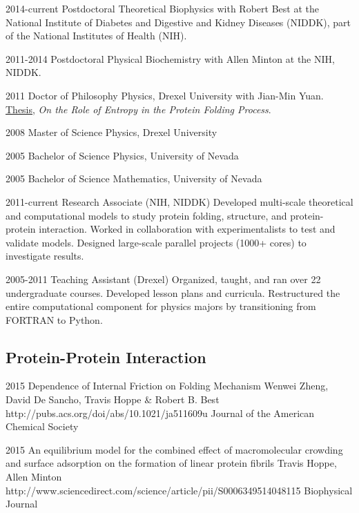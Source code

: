 \documentclass[]{scrartcl}
\begin{document}
\begin{cleanCV}


\WorkExperience
{2014-current}
{Postdoctoral}
{
Theoretical Biophysics with Robert Best at the
National Institute of Diabetes and Digestive and Kidney Diseases (NIDDK), 
part of the National Institutes of Health (NIH).
}

\WorkExperience
{2011-2014}
{Postdoctoral}
{
Physical Biochemistry with Allen Minton at the NIH, NIDDK.
}


\WorkExperience
{2011}
{Doctor of Philosophy}
{%
Physics, Drexel University with Jian-Min Yuan. 
\href{https://idea.library.drexel.edu/islandora/object/idea:3488}{Thesis},
\emph{On the Role of Entropy in the Protein Folding Process}.
}

\WorkExperience
{2008}
{Master of Science}
{Physics, Drexel University}

\WorkExperience
{2005}
{Bachelor of Science}
{Physics, University of Nevada}

\WorkExperience
{2005}
{Bachelor of Science}
{Mathematics, University of Nevada}



\WorkExperience
{2011-current}
{Research Associate (NIH, NIDDK)}
{%
  Developed multi-scale theoretical and computational models to study protein folding, structure, and protein-protein interaction.
Worked in collaboration with experimentalists to test and validate models. 
Designed large-scale parallel projects (1000+ cores) to investigate results. 
}

\WorkExperience
{2005-2011}
{Teaching Assistant (Drexel)}
{%
  Organized, taught, and ran over 22 undergraduate courses.
  Developed lesson plans and curricula.
  Restructured the entire computational component for physics majors by transitioning from FORTRAN to Python.
}


\subsection{Protein-Protein Interaction}

\Paper
{2015}
{Dependence of Internal Friction on Folding Mechanism}
{Wenwei Zheng, David De Sancho, Travis Hoppe \& Robert B. Best}
{http://pubs.acs.org/doi/abs/10.1021/ja511609u}
{Journal of the American Chemical Society}

\Paper
{2015}
{An equilibrium model for the combined effect of macromolecular crowding and surface adsorption on the formation of linear protein fibrils}
{Travis Hoppe, Allen Minton}
{http://www.sciencedirect.com/science/article/pii/S0006349514048115}
{Biophysical Journal}


\end{cleanCV}
\end{document}
